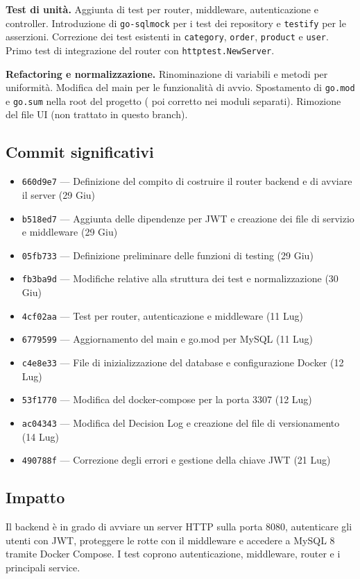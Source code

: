 \documentclass[a4paper,12pt]{article}
\begin{document}
\textbf{Test di unit\`{a.}}
Aggiunta di test per router, middleware, autenticazione e controller. Introduzione di \texttt{go-sqlmock} per i test dei repository e \texttt{testify} per le asserzioni. Correzione dei test esistenti in \texttt{category}, \texttt{order}, \texttt{product} e \texttt{user}. Primo test di integrazione del router con \texttt{httptest.NewServer}.

\textbf{Refactoring e normalizzazione.}
Rinominazione di variabili e metodi per uniformit\`{a}. Modifica del main per le funzionalit\`{a} di avvio. Spostamento di \texttt{go.mod} e \texttt{go.sum} nella root del progetto ( poi corretto nei moduli separati). Rimozione del file UI (non trattato in questo branch).

\subsection*{Commit significativi}
\begin{itemize}
    \item \texttt{660d9e7} --- Definizione del compito di costruire il router backend e di avviare il server (29 Giu)
    \item \texttt{b518ed7} --- Aggiunta delle dipendenze per JWT e creazione dei file di servizio e middleware (29 Giu)
    \item \texttt{05fb733} --- Definizione preliminare delle funzioni di testing (29 Giu)
    \item \texttt{fb3ba9d} --- Modifiche relative alla struttura dei test e normalizzazione (30 Giu)
    \item \texttt{4cf02aa} --- Test per router, autenticazione e middleware (11 Lug)
    \item \texttt{6779599} --- Aggiornamento del main e go.mod per MySQL (11 Lug)
    \item \texttt{c4e8e33} --- File di inizializzazione del database e configurazione Docker (12 Lug)
    \item \texttt{53f1770} --- Modifica del docker-compose per la porta 3307 (12 Lug)
    \item \texttt{ac04343} --- Modifica del Decision Log e creazione del file di versionamento (14 Lug)
    \item \texttt{490788f} --- Correzione degli errori e gestione della chiave JWT (21 Lug)
\end{itemize}

\subsection*{Impatto}
Il backend \`{e} in grado di avviare un server HTTP sulla porta 8080, autenticare gli utenti con JWT, proteggere le rotte con il middleware e accedere a MySQL 8 tramite Docker Compose. I test coprono autenticazione, middleware, router e i principali service.
\end{document}
